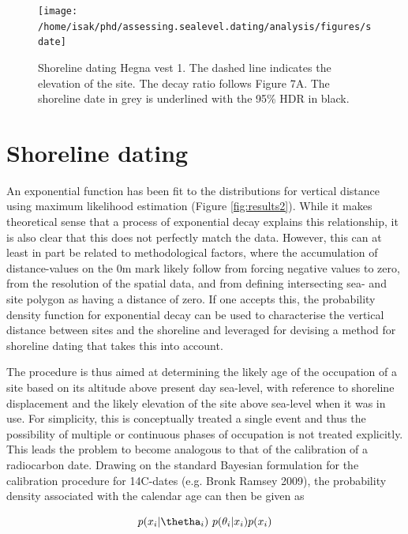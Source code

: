 \documentclass[
]{article}
\begin{document}
\begin{figure}

{\centering \texttt{[image: /home/isak/phd/assessing.sealevel.dating/analysis/figures/sdate]} 

}

\caption{Shoreline dating Hegna vest 1. The dashed line indicates the elevation of the site. The decay ratio follows Figure 7A. The shoreline date in grey is underlined with the 95\% HDR in black.}\label{fig:exampledat}
\end{figure}

\hypertarget{shoreline-dating}{%
\section{Shoreline dating}\label{shoreline-dating}}

An exponential function has been fit to the distributions for vertical distance using maximum likelihood estimation (Figure \ref{fig:results2}). While it makes theoretical sense that a process of exponential decay explains this relationship, it is also clear that this does not perfectly match the data. However, this can at least in part be related to methodological factors, where the accumulation of distance-values on the 0m mark likely follow from forcing negative values to zero, from the resolution of the spatial data, and from defining intersecting sea- and site polygon as having a distance of zero. If one accepts this, the probability density function for exponential decay can be used to characterise the vertical distance between sites and the shoreline and leveraged for devising a method for shoreline dating that takes this into account.

The procedure is thus aimed at determining the likely age of the occupation of a site based on its altitude above present day sea-level, with reference to shoreline displacement and the likely elevation of the site above sea-level when it was in use. For simplicity, this is conceptually treated a single event and thus the possibility of multiple or continuous phases of occupation is not treated explicitly. This leads the problem to become analogous to that of the calibration of a radiocarbon date. Drawing on the standard Bayesian formulation for the calibration procedure for 14C-dates (e.g. Bronk Ramsey 2009), the probability density associated with the calendar age can then be given as

\begin{equation} 
  p(x_{i} | \thetha_{i}) ~ p(\theta_{i} | x_{i})p(x_{i})
  \label{eq:bayes}
\end{equation}
\end{document}
